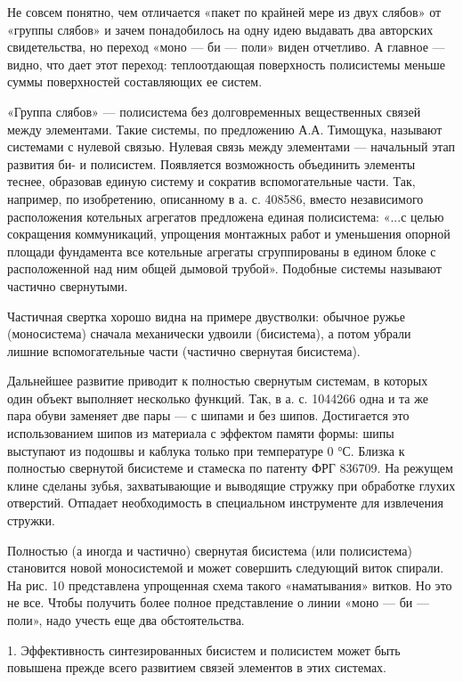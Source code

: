 Не  совсем понятно,  чем отличается  «пакет  по крайней  мере из  двух
слябов» от «группы слябов» и  зачем понадобилось на одну идею выдавать
два  авторских свидетельства,  но переход  «моно  — би  — поли»  виден
отчетливо. А  главное —  видно, что  дает этот  переход: теплоотдающая
поверхность  полисистемы  меньше  суммы поверхностей  составляющих  ее
систем.

«Группа слябов»  — полисистема без долговременных  вещественных связей
между  элементами.  Такие  системы,   по  предложению  А.А.  Тимощука,
называют системами с нулевой связью.  Нулевая связь между элементами —
начальный  этап  развития  би- и  полисистем.  Появляется  возможность
объединить  элементы  теснее,  образовав  единую  систему  и  сократив
вспомогательные  части. Так,  например, по  изобретению, описанному  в
а.  с. 408586,  вместо независимого  расположения котельных  агрегатов
предложена  единая полисистема:  «...с целью  сокращения коммуникаций,
упрощения монтажных работ и  уменьшения опорной площади фундамента все
котельные  агрегаты  сгруппированы  в  едином  блоке  с  расположенной
над  ним общей  дымовой  трубой». Подобные  системы называют  частично
свернутыми.

Частичная свертка  хорошо видна  на примере двустволки:  обычное ружье
(моносистема) сначала механически удвоили  (бисистема), а потом убрали
лишние вспомогательные части (частично свернутая бисистема).

Дальнейшее развитие приводит к полностью свернутым системам, в которых
один объект выполняет  несколько функций. Так, в а. с.  1044266 одна и
та же пара обуви заменяет две пары — с шипами и без шипов. Достигается
это использованием  шипов из материала  с эффектом памяти  формы: шипы
выступают из подошвы  и каблука только при температуре 0  °С. Близка к
полностью свернутой  бисистеме и  стамеска по  патенту ФРГ  836709. На
режущем  клине сделаны  зубья, захватывающие  и выводящие  стружку при
обработке  глухих  отверстий.  Отпадает  необходимость  в  специальном
инструменте для извлечения стружки.

Полностью (а иногда и  частично) свернутая бисистема (или полисистема)
становится  новой  моносистемой  и  может  совершить  следующий  виток
спирали. На рис. 10 представлена упрощенная схема такого «наматывания»
витков. Но  это не  все. Чтобы получить  более полное  представление о
линии «моно — би — поли», надо учесть еще два обстоятельства.

1.  Эффективность синтезированных  бисистем  и  полисистем может  быть
повышена прежде всего развитием связей элементов в этих системах.

